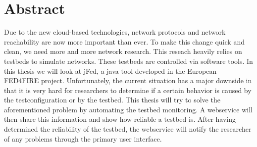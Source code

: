 \newpage
\chapter*{Abstract}
\npar
Due to the new cloud-based technologies, network protocols and network reachability are now more important than ever. To make this change quick and clean, we need more and more network research. This reseach heavily relies on testbeds to simulate networks. These testbeds are controlled via software tools. In this thesis we will look at jFed, a java tool developed in the European FED4FIRE project. Unfortunately, the current situation has a major downside in that it is very hard for researchers to determine if a certain behavior is caused by the testconfiguration or by the testbed. 
\npar
This thesis will try to solve the aforementioned problem by automating the testbed monitoring. A webservice will then share this information and show how reliable a testbed is. After having determined the reliability of the testbed, the webservice will notify the researcher of any problems through the primary user interface.